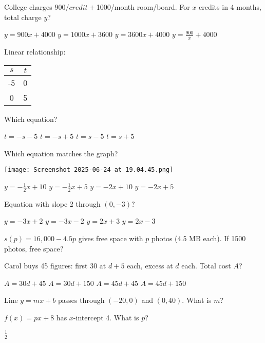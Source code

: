 \documentclass[12pt]{exam}
\begin{document}
\begin{questions}
\question College charges $900/credit + $1000/month room/board. For $x$ credits in 4 months, total charge $y$?
\begin{choices}
\choice $y = 900x + 4000$
\choice $y = 1000x + 3600$
\choice $y = 3600x + 4000$
\choice $y = \frac{900}{x} + 4000$
\end{choices}

\question Linear relationship:
\begin{center}
\begin{tabular}{|c|c|}
\hline
$s$ & $t$ \\
\hline
-5 & 0 \\
0 & 5 \\
\hline
\end{tabular}
\end{center}
Which equation?
\begin{choices}
\choice $t = -s - 5$
\choice $t = -s + 5$
\choice $t = s - 5$
\choice $t = s + 5$
\end{choices}

\question Which equation matches the graph?
\begin{center}
\texttt{[image: Screenshot 2025-06-24 at 19.04.45.png]}
\end{center}
\begin{choices}
\choice $y = -\frac{1}{2}x + 10$
\choice $y = -\frac{1}{2}x + 5$
\choice $y = -2x + 10$
\choice $y = -2x + 5$
\end{choices}

\question Equation with slope 2 through $(0,-3)$?
\begin{choices}
\choice $y = -3x + 2$
\choice $y = -3x - 2$
\choice $y = 2x + 3$
\choice $y = 2x - 3$
\end{choices}

\question $s(p) = 16,000 - 4.5p$ gives free space with $p$ photos (4.5 MB each). If 1500 photos, free space?

\question Carol buys 45 figures: first 30 at $d+5$ each, excess at $d$ each. Total cost $A$?
\begin{choices}
\choice $A = 30d + 45$
\choice $A = 30d + 150$
\choice $A = 45d + 45$
\choice $A = 45d + 150$
\end{choices}

\question Line $y = mx + b$ passes through $(-20,0)$ and $(0,40)$. What is $m$?

\question $f(x) = px + 8$ has $x$-intercept 4. What is $p$?
\begin{choices}
\choice $\frac{1}{2}$
\end{choices}


\end{questions}
\end{document}
